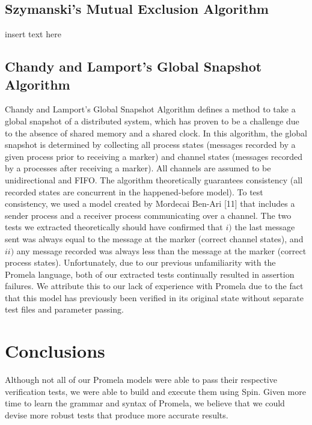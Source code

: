 \documentclass[12pt]{article}
\begin{document}
\begin{flushleft}
\subsection{Szymanski's Mutual Exclusion Algorithm}
insert text here

\subsection{Chandy and Lamport's Global Snapshot Algorithm}
Chandy and Lamport's Global Snapshot Algorithm defines a method to take a global
snapshot of a distributed system, which has proven to be a challenge due to the
absence of shared memory and a shared clock. In this algorithm, the global
snapshot is determined by collecting all process states (messages recorded by a
given process prior to receiving a marker) and channel states (messages recorded
by a processes after receiving a marker). All channels are assumed to be
unidirectional and FIFO. The algorithm theoretically guarantees consistency (all
recorded states are concurrent in the happened-before model). To test
consistency, we used a model created by Mordecai Ben-Ari [11] that includes a
sender process and a receiver process communicating over a channel. The two
tests we extracted theoretically should have confirmed that $i)$ the last
message sent was always equal to the message at the marker (correct channel
states), and $ii)$ any message recorded was always less than the message at the
marker (correct process states). Unfortunately, due to our previous
unfamiliarity with the Promela language, both of our extracted tests continually
resulted in assertion failures. We attribute this to our lack of experience with
Promela due to the fact that this model has previously been verified in its
original state without separate test files and parameter passing.

\section{Conclusions}
Although not all of our Promela models were able to pass their respective
verification tests, we were able to build and execute them using Spin. Given
more time to learn the grammar and syntax of Promela, we believe that we could
devise more robust tests that produce more accurate results.


\end{flushleft}
\end{document}
